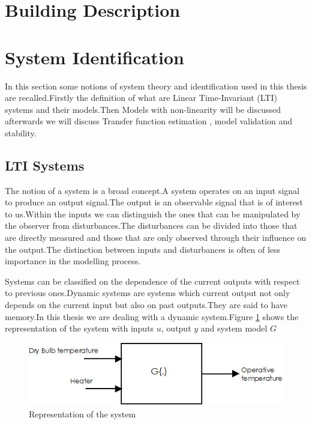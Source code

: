 \documentclass[a4paper,12pt]{article}
\numberwithin{equation}{section}
\begin{document}
\section{Building Description}
\newpage
\section{System Identification}
In this section some notions of system theory and identification used in this thesis are recalled.Firstly the definition of  what are Linear Time-Invariant (LTI) systems and their models.Then Models with non-linearity will be discussed afterwards we will discuss Transfer function estimation , model validation and stability. 

\subsection{LTI Systems}

The notion of a system is a broad concept.A system operates on an input signal to produce an output signal.The output is an observable signal that is of interest to us.Within the inputs we can distinguish the ones that can be manipulated by the observer from disturbances.The disturbances can be divided into those that are directly measured and those that are only observed through their influence on the output.The distinction between inputs and disturbances is often of less importance in the modelling process.

Systems can be classified on the dependence of the current outputs with respect to previous ones.Dynamic systems are systems which current output not only depends on the current input but also on past outputs.They are said to have memory.In this thesis we are dealing with a dynamic system.Figure \ref{fig:system representation} shows the representation of the system with inputs $u$, output $y$ and system model $G$

\begin{figure}[H]
    \includegraphics[scale=1]{system.jpeg}
    \centering
    \caption{Representation of the system}
    \label{fig:system representation}
\end{figure}
\end{document}
